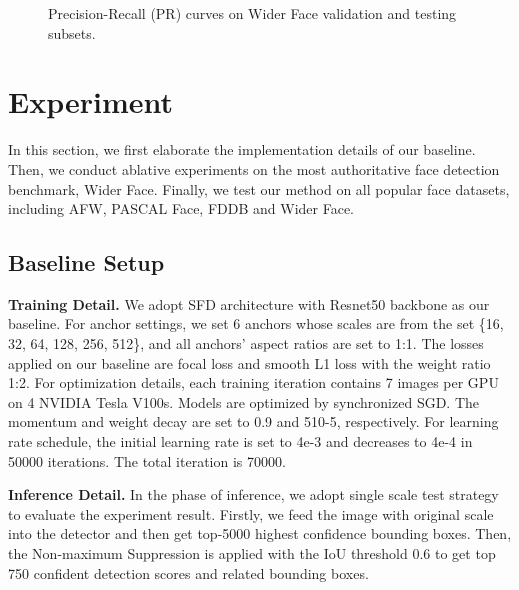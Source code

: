\documentclass[10pt,twocolumn,letterpaper]{article}
\begin{document}
\begin{figure*}[t]
    \centering
    \hspace{0.3in}
    
    \hspace{0.3in}
    \caption{Precision-Recall (PR) curves on Wider Face validation and testing subsets.}
    \label{img_5}
    \vspace{-2mm}
\end{figure*}

\section{Experiment}
\label{sec:experiment}
In this section, we first elaborate the implementation details of our baseline. Then, we conduct ablative experiments on the most authoritative face detection benchmark, Wider Face. Finally, we test our method on all popular face datasets, including AFW, PASCAL Face, FDDB and Wider Face. 

\subsection{Baseline Setup}
\noindent\textbf{Training Detail.} 
 We adopt SFD \cite{zhang2017s3fd} architecture with Resnet50 \cite{he2016deep} backbone as our baseline. For anchor settings,  we set 6 anchors whose scales are from the set \{16, 32, 64, 128, 256, 512\}, and all anchors’ aspect ratios are set to 1:1. The losses applied on our baseline are focal loss and smooth L1 loss with the weight ratio 1:2. 
 For optimization details, each training iteration contains 7 images per GPU on 4 NVIDIA Tesla V100s. Models are optimized by synchronized SGD. The momentum and weight decay are set to 0.9 and 510-5, respectively. For learning rate schedule, the initial learning rate is set to 4e-3 and decreases to 4e-4 in 50000 iterations. The total iteration is 70000. 
 
 \noindent\textbf{Inference Detail.}
In the phase of inference, we adopt single scale test strategy to evaluate the experiment result. Firstly, we feed the image with original scale into the detector and then get top-5000 highest confidence bounding boxes. Then, the Non-maximum Suppression is applied with the IoU threshold 0.6 to get top 750 confident detection scores and related bounding boxes. 
\end{document}
